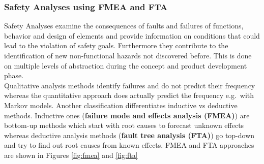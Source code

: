 \subsubsection*{Safety Analyses using FMEA and FTA}
Safety Analyses examine the consequences of faults and failures of functions, behavior and design of elements and provide information on conditions that could lead to the violation of safety goals.
Furthermore they contribute to the identification of new non-functional hazards not discovered before.
This is done on multiple levels of abstraction during the concept and product development phase.\\
Qualitative analysis methods identify failures and do not predict their frequency whereas the quantitative approach does actually predict the frequency e.g.\ with Markov models.
Another classification differentiates inductive vs deductive methods.
Inductive ones (\textbf{failure mode and effects analysis (FMEA)}) are bottom-up methods which start with root causes to forecast unknown effects whereas deductive analysis methods (\textbf{fault tree analysis (FTA)}) go top-down and try to find out root causes from known effects.
FMEA and FTA approaches are shown in Figures \ref{fig:fmea} and \ref{fig:fta}
